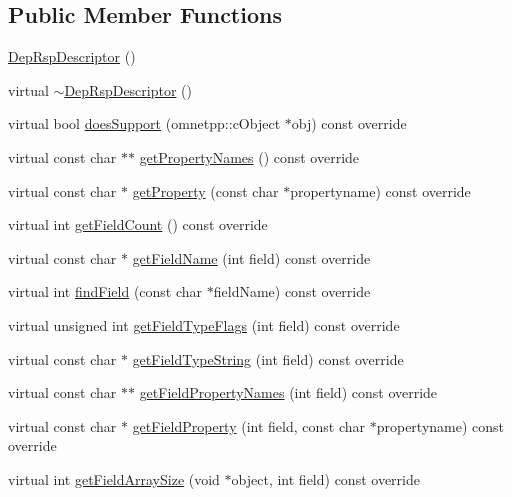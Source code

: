 \subsection*{Public Member Functions}
\begin{DoxyCompactItemize}
\item 
\hyperlink{classDepRspDescriptor_ad256a6a63460351ea6a372618915c2d8}{Dep\+Rsp\+Descriptor} ()
\item 
virtual \hyperlink{classDepRspDescriptor_abc19e536e455faeb3fd8670b5447a083}{$\sim$\+Dep\+Rsp\+Descriptor} ()
\item 
virtual bool \hyperlink{classDepRspDescriptor_a7a880007ffa97b1e7506e5006dff76fc}{does\+Support} (omnetpp\+::c\+Object $\ast$obj) const override
\item 
virtual const char $\ast$$\ast$ \hyperlink{classDepRspDescriptor_a9549506315f1c8710721599924afec0d}{get\+Property\+Names} () const override
\item 
virtual const char $\ast$ \hyperlink{classDepRspDescriptor_aafacdcf48c89777dd32b2515d46156a3}{get\+Property} (const char $\ast$propertyname) const override
\item 
virtual int \hyperlink{classDepRspDescriptor_a7704deff767464de71b08e877144aef3}{get\+Field\+Count} () const override
\item 
virtual const char $\ast$ \hyperlink{classDepRspDescriptor_a7ae3b3dbb2acbc29d3e6b9d80dad5f42}{get\+Field\+Name} (int field) const override
\item 
virtual int \hyperlink{classDepRspDescriptor_a585faf6892da7b79d18edde57949fcc6}{find\+Field} (const char $\ast$field\+Name) const override
\item 
virtual unsigned int \hyperlink{classDepRspDescriptor_a1d2e200ee36fc4be43c1babc7b1b4a19}{get\+Field\+Type\+Flags} (int field) const override
\item 
virtual const char $\ast$ \hyperlink{classDepRspDescriptor_a2886a2c8ff88687682793f94abeee31b}{get\+Field\+Type\+String} (int field) const override
\item 
virtual const char $\ast$$\ast$ \hyperlink{classDepRspDescriptor_ae59e1248d631d86bbec3d02c5cd03db8}{get\+Field\+Property\+Names} (int field) const override
\item 
virtual const char $\ast$ \hyperlink{classDepRspDescriptor_a8cf738132398ab2204904ed1388fcd40}{get\+Field\+Property} (int field, const char $\ast$propertyname) const override
\item 
virtual int \hyperlink{classDepRspDescriptor_a559a24842bd0a622463eb3417a31fc5c}{get\+Field\+Array\+Size} (void $\ast$object, int field) const override

\end{DoxyCompactItemize}

